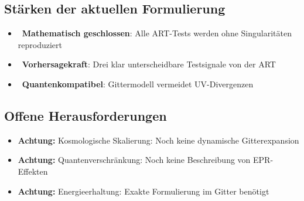 \documentclass{article}
\begin{document}
\begin{center}
\end{center}

\subsection*{Stärken der aktuellen Formulierung}
\begin{itemize}
    \item \checkmark~\textbf{Mathematisch geschlossen}: Alle ART-Tests werden ohne Singularitäten reproduziert
    \item \checkmark~\textbf{Vorhersagekraft}: Drei klar unterscheidbare Testsignale von der ART
    \item \checkmark~\textbf{Quantenkompatibel}: Gittermodell vermeidet UV-Divergenzen
\end{itemize}

\subsection*{Offene Herausforderungen}
\begin{itemize}
    \item \textbf{Achtung:} Kosmologische Skalierung: Noch keine dynamische Gitterexpansion
    \item \textbf{Achtung:} Quantenverschränkung: Noch keine Beschreibung von EPR-Effekten
    \item \textbf{Achtung:} Energieerhaltung: Exakte Formulierung im Gitter benötigt
\end{itemize}
\end{document}
